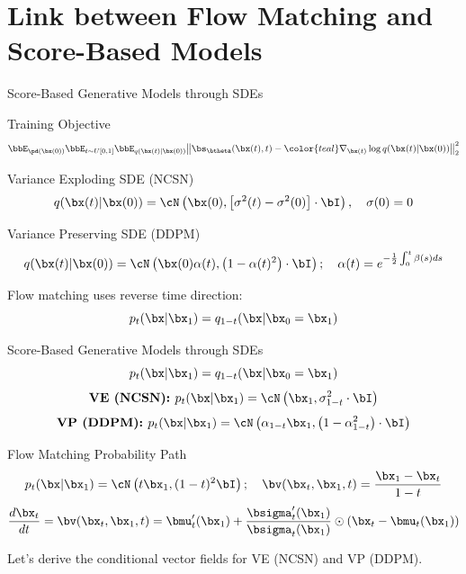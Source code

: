 \documentclass{beamer}
\begin{document}
\section{Link between Flow Matching and Score-Based Models}
\begin{frame}{Score-Based Generative Models through SDEs}
	\vspace{-0.3cm}
	\begin{block}{Training Objective}
		\vspace{-0.7cm}
		\[
			\bbE_{\pd(\bx(0))} \bbE_{t \sim U[0, 1]} \bbE_{q(\bx(t) | \bx(0))}\bigl\| \bs_{\btheta}(\bx(t), t) - {\color{teal}\nabla_{\bx(t)} \log q(\bx(t) | \bx(0))} \bigr\|^2_2
		\]
		\vspace{-0.5cm}
	\end{block}
	\eqpause
	\begin{block}{Variance Exploding SDE (NCSN)}
		\vspace{-0.3cm}
		\[
			q(\bx(t) | \bx(0)) = \cN\left(\bx(0), \left[\sigma^2(t) - \sigma^2(0)\right] \cdot \bI\right), \quad \sigma(0) =0
		\]
		\vspace{-0.5cm}
	\end{block}
	\begin{block}{Variance Preserving SDE (DDPM)}
		\vspace{-0.5cm}
		\[
			q(\bx(t) | \bx(0)) = \cN\left(\bx(0) \alpha(t), \left(1 - \alpha(t)^2\right) \cdot \bI\right); \quad \alpha(t) = e^{-\frac{1}{2} \int_0^t \beta(s) ds}
		\]
		\vspace{-0.5cm}
	\end{block}
	\eqpause
	Flow matching uses reverse time direction:
	\[
		p_t(\bx| \bx_1) = q_{1-t}(\bx| \bx_0=\bx_1)
	\]
\end{frame}
\begin{frame}{Score-Based Generative Models through SDEs}
	\[
		p_t(\bx| \bx_1) = q_{1-t}(\bx| \bx_0=\bx_1)
	\]
	\[
		\textbf{VE (NCSN): } p_t(\bx | \bx_1) = \cN\left(\bx_1, \sigma^2_{1-t} \cdot \bI\right)
	\]
	\vspace{-0.5cm}
	\[
		\textbf{VP (DDPM): } p_t(\bx | \bx_1) = \cN\left(\alpha_{1-t} \bx_1, \left(1 - \alpha_{1-t}^2\right) \cdot \bI\right)
	\]
	\vspace{-0.5cm}
	\eqpause
	\begin{block}{Flow Matching Probability Path}
		\vspace{-0.3cm}
		\[
			p_t(\bx | \bx_1) = \cN\left(t \bx_1, (1-t)^2 \bI\right); \quad \bv(\bx_t, \bx_1, t) = \frac{\bx_1  - \bx_t}{1-t}
		\]
		\vspace{-0.3cm}
		\[
	 		\frac{d\bx_t}{dt} = \bv(\bx_t, \bx_1, t) =  \bmu_t'(\bx_1) + \frac{\bsigma_t'(\bx_1)}{\bsigma_t(\bx_1)} \odot (\bx_t - \bmu_t(\bx_1))
		\]
	\end{block}
	\eqpause
	Let's derive the conditional vector fields for VE (NCSN) and VP (DDPM).
\end{frame}
\end{document}
